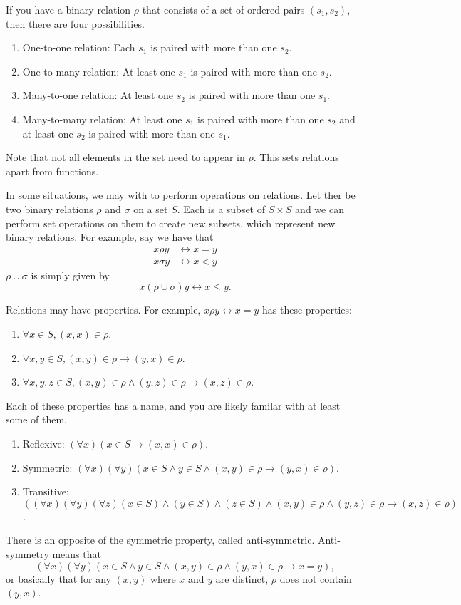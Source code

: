 \documentclass[nobib]{tufte-handout}
\begin{document}
If you have a binary relation $\rho$ that consists of 
a set of ordered pairs $(s_1, s_2)$, then there
are four possibilities.
\begin{enumerate}
    \item One-to-one relation: Each $s_1$ is paired with more than one $s_2$. 
    \item One-to-many relation: At least one $s_1$ is paired with more than one $s_2$. 
    \item Many-to-one relation: At least one $s_2$ is paired with more than one $s_1$. 
    \item Many-to-many relation: At least one $s_1$ is paired with more than one $s_2$ and 
    at least one $s_2$ is paired with more than one $s_1$. 
\end{enumerate}
Note that not all elements in the set need to appear in $\rho$. This 
sets relations apart from functions. 

In some situations, we may with to perform operations 
on relations. Let ther be two binary relations 
$\rho$ and $\sigma$ on a set $S$. Each is a subset 
of $S\times S$ and we can perform set operations 
on them to create new subsets, which represent new 
binary relations. For example, say we have that 
\begin{align*}
    x \rho y &\leftrightarrow x = y \\
    x \sigma y &\leftrightarrow x < y
\end{align*}
$\rho \cup \sigma$ is simply given by 
\[ x (\rho \cup \sigma) y \leftrightarrow x \leq y.\]

Relations may have properties. For example, 
$x \rho y \leftrightarrow x = y$ has these properties:
\begin{enumerate}
    \item $\forall x\in S, (x,x) \in \rho$. 
    \item $\forall x, y \in S, (x,y) \in \rho \rightarrow (y,x) \in \rho$. 
    \item $\forall x,y,z \in S, (x,y) \in \rho \land (y,z) \in \rho \rightarrow (x,z) \in \rho$.
\end{enumerate}
Each of these properties has a name, and 
you are likely familar with at least some of them. 
\begin{enumerate}
    \item Reflexive: $(\forall x)(x \in S \rightarrow (x,x) \in \rho)$.
    \item Symmetric: $(\forall x)(\forall y)(x \in S \land y \in S \land (x,y) \in \rho \rightarrow (y,x) \in \rho)$.
    \item Transitive: $((\forall x)(\forall y)(\forall z)(x\in S) \land (y\in S) \land (z\in S) \land (x,y) \in \rho \land (y,z) \in \rho \rightarrow (x,z) \in \rho)$. 
\end{enumerate}
There is an opposite of the symmetric property, 
called anti-symmetric. 
Anti-symmetry means that 
\[(\forall x)(\forall y)(x \in S \land y \in S \land (x,y)\in \rho \land (y,x) \in \rho \rightarrow x = y),\]
or basically that for any $(x,y)$ where $x$ and $y$ are distinct, $\rho$ does not contain $(y,x)$. 
\end{document}
